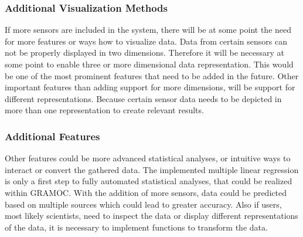 \subsubsection{Additional Visualization Methods}
If more sensors are included in the system, there will be at some point the need for more features or ways how to visualize data. Data from certain sensors can not be properly displayed in two dimensions. Therefore it will be necessary at some point to enable three or more dimensional data representation. This would be one of the most prominent features that need to be added in the future. Other important features than adding support for more dimensions, will be support for different representations. Because certain sensor data needs to be depicted in more than one representation to create relevant results.

\subsubsection{Additional Features}
Other features could be more advanced statistical analyses, or intuitive ways to interact or convert the gathered data. The implemented multiple linear regression is only a first step to fully automated statistical analyses, that could be realized within GRAMOC. With the addition of more sensors, data could be predicted based on multiple sources which could lead to greater accuracy. Also if users, most likely scientists, need to inspect the data or display different representations of the data, it is necessary to implement functions to transform the data.

